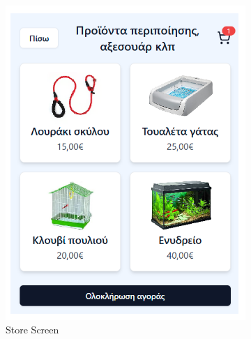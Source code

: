\documentclass[12pt,a4paper,twoside]{book}
\begin{document}
\begin{figure}[H]
    \centering
    \begin{subfigure}[b]{0.48\textwidth}
        \centering
        \includegraphics[width=\textwidth]{Mockup Screens/mockup-store.png}
        \caption{Store Screen}\label{fig:mockup5}
    \end{subfigure}
    \hfill
    \begin{subfigure}[b]{0.48\textwidth}
        \centering

\end{subfigure}
\end{figure}
\end{document}
